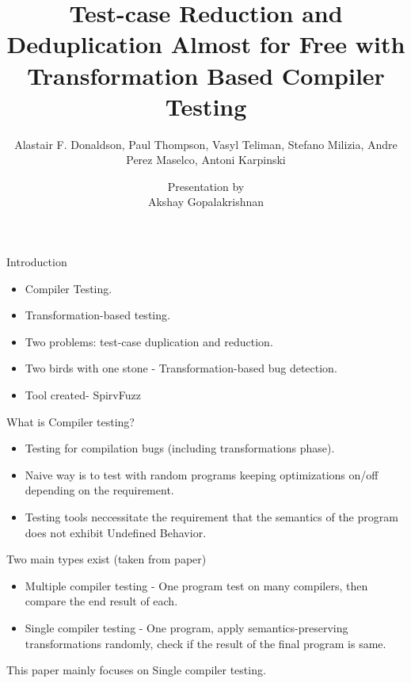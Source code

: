 \documentclass{beamer}
\title{Test-case Reduction and Deduplication Almost for Free with Transformation Based Compiler Testing}
\subtitle{Alastair F. Donaldson, Paul Thompson, Vasyl Teliman, Stefano Milizia, Andre Perez Maselco, Antoni Karpinski}
\author{Presentation by \\ Akshay Gopalakrishnan}
\institute{McGill University}
\begin{document}
    
    \begin{frame}
        \titlepage 

    \end{frame}


    \begin{frame}{Introduction}

        \begin{itemize}
            \item Compiler Testing.
            \item Transformation-based testing.
            \item Two problems: test-case duplication and reduction.
            \item Two birds with one stone - Transformation-based bug detection.
            \item Tool created- SpirvFuzz
        \end{itemize}

    \end{frame}


    \begin{frame}{What is Compiler testing?}

        \begin{itemize}
            \item Testing for compilation bugs (including transformations phase).
            \item Naive way is to test with random programs keeping optimizations on/off depending on the requirement. 
            \item Testing tools neccessitate the requirement that the semantics of the program does not exhibit Undefined Behavior.
        \end{itemize}
        Two main types exist (taken from paper)
        \begin{itemize}
            \item Multiple compiler testing - One program test on many compilers, then compare the end result of each.  
            \item Single compiler testing - One program, apply semantics-preserving transformations randomly, check if the result of the final program is same. 
        \end{itemize}

        This paper mainly focuses on Single compiler testing. 

    \end{frame}
\end{document}
